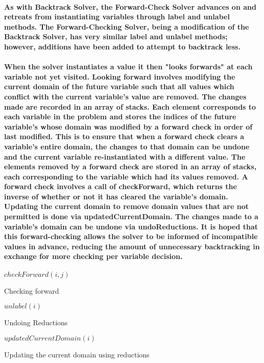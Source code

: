 \documentclass{article}
\begin{document}
\paragraph*{As with Backtrack Solver, the Forward-Check Solver advances on and retreats from instantiating variables through label and unlabel methods. The Forward-Checking Solver, being a modification of the Backtrack Solver, has very similar label and unlabel methods; however, additions have been added to attempt to backtrack less.}

\paragraph*{When the solver instantiates a value it then "looks forwards" at each variable not yet visited. Looking forward involves modifying the current domain of the future variable such that all values which conflict with the current variable's value are removed. The changes made are recorded in an array of stacks. Each element corresponds to each variable in the problem and stores the indices of the future variable's whose domain was modified by a forward check in order of last modified. This is to ensure that when a forward check clears a variable's entire domain, the changes to that domain can be undone and the current variable re-instantiated with a different value. The elements removed by a forward check are stored in an array of stacks, each corresponding to the variable which had its values removed. A forward check involves a call of checkForward, which returns the inverse of whether or not it has cleared the variable's domain. Updating the current domain to remove domain values that are not permitted is done via updatedCurrentDomain. The changes made to a variable's domain can be undone via undoReductions. It is hoped that this forward-checking allows the solver to be informed of incompatible values in advance, reducing the amount of unnecessary backtracking in exchange for more checking per variable decision.}

\begin{algorithm}
\DontPrintSemicolon
\nl $checkForward(i, j)$\;
\nl {}
\caption{Checking forward}
\label{checkForward}
\end{algorithm}

\begin{algorithm}
\DontPrintSemicolon
\nl $unlabel(i)$\;
\nl {}
\caption{Undoing Reductions}
\label{undoReductions}
\end{algorithm}

\begin{algorithm}
\DontPrintSemicolon
\nl $updatedCurrentDomain(i)$\;
\nl \Begin{
}
\caption{Updating the current domain using reductions}
\label{updateCurrentDomain}
\end{algorithm}



\end{document}
